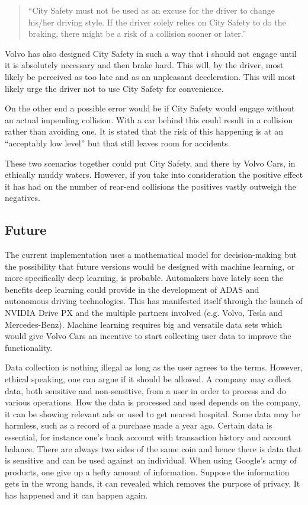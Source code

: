 \documentclass[conference]{IEEEtran}
\begin{document}
\begin{quotation}
	``City Safety must not be used as an excuse for the driver to change his/her driving style. If the driver solely relies on City Safety to do the braking, there might be a risk of a collision sooner or later.'' \cite{CitySafetyLegal}
\end{quotation}

Volvo has also designed City Safety in such a way that i should not engage until it is absolutely necessary and then brake hard. This will, by the driver, most likely be perceived as too late and as an unpleasant deceleration. This will most likely urge the driver not to use City Safety for convenience.

On the other end a possible error would be if City Safety would engage without an actual impending collision. With a car behind this could result in a collision rather than avoiding one. It is stated that the risk of this happening is at an ``acceptably low level'' \cite{SysDescription} but that still leaves room for accidents.

These two scenarios together could put City Safety, and there by Volvo Cars, in ethically muddy waters. However, if you take into consideration the positive effect it has had on the number of rear-end collisions \cite{CitySafety} the positives vastly outweigh the negatives.

\subsection{Future}
The current implementation uses a mathematical model for decision-making but the possibility that future versions would be designed with machine learning, or more specifically deep learning, is probable. \cite{SysDescription} Automakers have lately seen the benefits deep learning could provide in the development of ADAS and autonomous driving technologies. This has manifested itself through the launch of NVIDIA Drive PX and the multiple partners involved (e.g. Volvo, Tesla and Mercedes-Benz). \cite{DrivePX} Machine learning requires big and versatile data sets which would give Volvo Cars an incentive to start collecting user data to improve the functionality.

Data collection is nothing illegal as long as the user agrees to the terms. However, ethical speaking, one can argue if it should be allowed. A company may collect data, both sensitive and non-sensitive, from a user in order to process and do various operations. How the data is processed and used depends on the company, it can be showing relevant ads or used to get nearest hospital. \cite{GoogleAds,GoogleNearby,GoogleUserData} Some data may be harmless, such as a record of a purchase made a year ago. Certain data is essential, for instance one's bank account with transaction history and account balance. There are always two sides of the same coin and hence there is data that is sensitive and can be used against an individual. When using Google's army of products, one give up a hefty amount of information. \cite{GoogleUserData} Suppose the information gets in the wrong hands, it can revealed which removes the purpose of privacy. It has happened and it can happen again. \cite{TheFappening,EdwardSnowden} 
\end{document}
